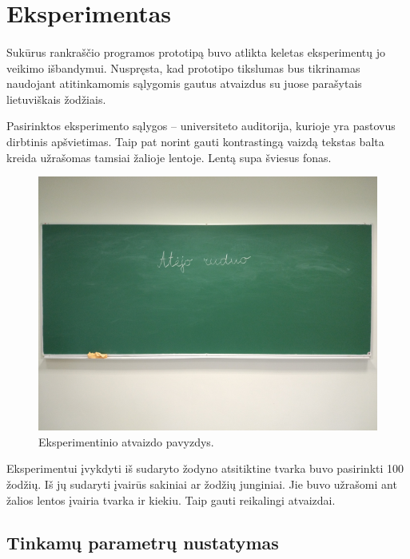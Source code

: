 \documentclass[a4paper,12pt]{article}
\begin{document}
\clearpage
\section{Eksperimentas}
\paragraph{} Sukūrus rankraščio programos prototipą buvo atlikta keletas eksperimentų jo veikimo išbandymui. Nuspręsta, kad prototipo tikslumas bus tikrinamas naudojant atitinkamomis sąlygomis gautus atvaizdus su juose parašytais lietuviškais žodžiais.

Pasirinktos eksperimento sąlygos – universiteto auditorija, kurioje yra pastovus dirbtinis apšvietimas. Taip pat norint gauti kontrastingą vaizdą tekstas balta kreida užrašomas tamsiai žalioje lentoje. Lentą supa šviesus fonas.
		\begin{figure}[H]
			\centering
			\includegraphics[scale=0.3]{images/sampleboard}
			\caption{Eksperimentinio atvaizdo pavyzdys.}   %
			\label{img:sampleboard}
		\end{figure}

Eksperimentui įvykdyti iš sudaryto žodyno atsitiktine tvarka buvo pasirinkti 100 žodžių. Iš jų sudaryti įvairūs sakiniai ar žodžių junginiai. Jie buvo užrašomi ant žalios lentos įvairia tvarka ir kiekiu. Taip gauti reikalingi atvaizdai.


\subsection{Tinkamų parametrų nustatymas}
\end{document}
